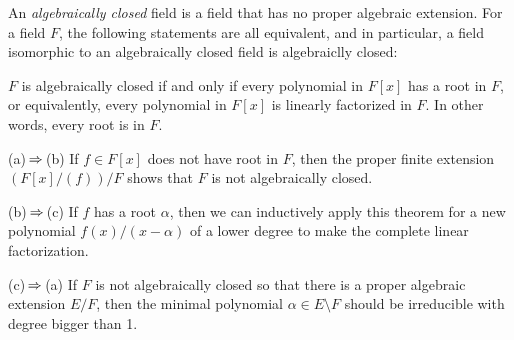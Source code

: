 \documentclass{../../large}
\begin{document}
\begin{prb}
An \emph{algebraically closed} field is a field that has no proper algebraic extension.
For a field $F$, the following statements are all equivalent, and in particular, a field isomorphic to an algebraically closed field is algebraiclly closed:
\begin{parts}
\item $F$ is algebraically closed if and only if every polynomial in $F[x]$ has a root in $F$, or equivalently, every polynomial in $F[x]$ is linearly factorized in $F$. In other words, every root is in $F$.
\end{parts}
\end{prb}
\begin{pf}
(a)$\impl$(b)
If $f\in F[x]$ does not have root in $F$, then the proper finite extension $(F[x]/(f))/F$ shows that $F$ is not algebraically closed.

(b)$\impl$(c)
If $f$ has a root $\alpha$, then we can inductively apply this theorem for a new polynomial $f(x)/(x-\alpha)$ of a lower degree to make the complete linear factorization.

(c)$\impl$(a)
If $F$ is not algebraically closed so that there is a proper algebraic extension $E/F$, then the minimal polynomial $\alpha\in E\setminus F$ should be irreducible with degree bigger than 1.
\end{pf}
\end{document}
